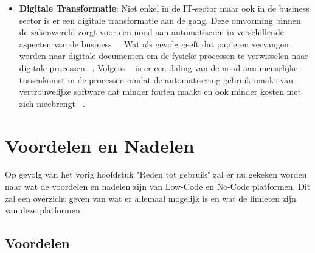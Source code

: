 \begin{itemize}
    \item \textbf{Digitale Transformatie}: 
    Niet enkel in de IT-sector maar ook in de business sector is er een digitale transformatie aan de gang. 
    Deze omvorming binnen de zakenwereld zorgt voor een nood aan automatiseren in verschillende aspecten van de business ~\autocite{ALSAADI_2021}. 
    Wat als gevolg geeft dat papieren vervangen worden naar digitale documenten om de fysieke processen te verwisselen naar digitale processen ~\autocite{ALSAADI_2021}. 
    Volgens ~\textcite{ALSAADI_2021} is er een daling van de nood aan menselijke tussenkomst in de processen omdat de automatisering gebruik maakt van vertrouwelijke software dat minder fouten maakt en ook minder kosten met zich meebrengt ~\autocite{ALSAADI_2021}.
  \end{itemize} 

\section{Voordelen en Nadelen}
\label{sec:voordelen-nadelen}
Op gevolg van het vorig hoofdstuk "Reden tot gebruik" zal er nu gekeken worden naar wat de voordelen en nadelen zijn van Low-Code en No-Code platformen. Dit zal
een overzicht geven van wat er allemaal mogelijk is en wat de limieten zijn van deze platformen.
\subsection{Voordelen}%
\label{subsec:voordelen}
